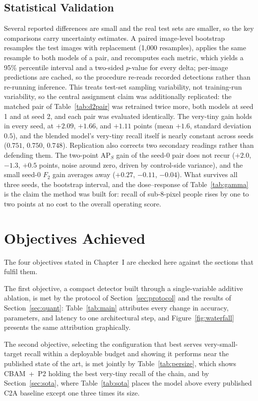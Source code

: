 \documentclass[12pt,a4paper,oneside]{report}
\begin{document}
\subsection{Statistical Validation}
\label{sec:stats}
Several reported differences are small and the real test sets are smaller, so
the key comparisons carry uncertainty estimates. A paired image-level
bootstrap resamples the test images with replacement (1{,}000 resamples),
applies the same resample to both models of a pair, and recomputes each
metric, which yields a 95\% percentile interval and a two-sided $p$-value for
every delta; per-image predictions are cached, so the procedure re-reads
recorded detections rather than re-running inference. This treats test-set
sampling variability, not training-run variability, so the central assignment
claim was additionally replicated: the matched pair of Table~\ref{tab:d2pair}
was retrained twice more, both models at seed 1 and at seed 2, and each pair
was evaluated identically. The very-tiny gain holds in every seed, at
$+2.09$, $+1.66$, and $+1.11$ points (mean $+1.6$, standard deviation
$0.5$), and the blended model's very-tiny recall itself is nearly constant
across seeds ($0.751$, $0.750$, $0.748$). Replication also corrects two
secondary readings rather than defending them. The two-point $\mathrm{AP}_S$
gain of the seed-0 pair does not recur ($+2.0$, $-1.3$, $+0.5$ points,
noise around zero, driven by control-side variance), and the small seed-0
$F_2$ gain averages away ($+0.27$, $-0.11$, $-0.04$). What survives all
three seeds, the bootstrap interval, and the dose--response of
Table~\ref{tab:gamma} is the claim the method was built for: recall of
sub-8-pixel people rises by one to two points at no cost to the overall
operating score.

\section{Objectives Achieved}
\label{sec:objectives}
The four objectives stated in Chapter~I are checked here against the sections
that fulfil them.

The first objective, a compact detector built through a single-variable
additive ablation, is met by the protocol of Section~\ref{sec:protocol} and
the results of Section~\ref{sec:quant}: Table~\ref{tab:main} attributes every
change in accuracy, parameters, and latency to one architectural step, and
Figure~\ref{fig:waterfall} presents the same attribution graphically.

The second objective, selecting the configuration that best serves
very-small-target recall within a deployable budget and showing it performs
near the published state of the art, is met jointly by
Table~\ref{tab:persize}, which shows CBAM~+~P2 holding the best very-tiny
recall of the chain, and by Section~\ref{sec:sota}, where
Table~\ref{tab:sota} places the model above every published C2A baseline
except one three times its size.
\end{document}

